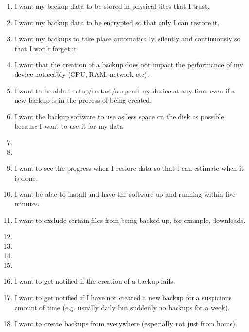 \begin{enumerate}
	\item   I want my backup data to be stored in physical sites that I trust.
	\item	I want my backup data to be encrypted so that only I can restore it.
	\item	I want my backups to take place automatically, silently and continuously so that I won't forget it
	\item	I want that the creation of a backup does not impact the performance of my device noticeably (CPU, RAM, network etc).
	\item	I want to be able to stop/restart/suspend my device at any time even if a new backup is in the process of being created.
	\item	I want the backup software to use as less space on the disk as possible because I want to use it for my data.
	\item {}
	\item	{}
	\item	I want to see the progress when I restore data so that I can estimate when it is done.
	\item	I want be able to install and have the software up and running within five minutes.
	\item	I want to exclude certain files from being backed up, for example, downloads.
	\item	{}
	\item	{}
	\item	{}
	\item	{}
	\item	I want to get notified if the creation of a backup fails.
	\item	I want to get notified if I have not created a new backup for a suspicious amount of time (e.g. usually daily but suddenly no backups for a week).
	\item	I want to create backups from everywhere (especially not just from home).

\end{enumerate}
